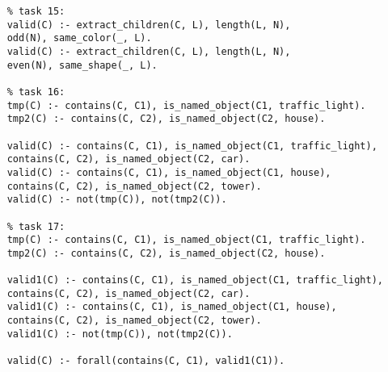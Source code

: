 \begin{verbatim}
	% task 15:
	valid(C) :- extract_children(C, L), length(L, N), 
	odd(N), same_color(_, L).
	valid(C) :- extract_children(C, L), length(L, N), 
	even(N), same_shape(_, L).
	
	% task 16:
	tmp(C) :- contains(C, C1), is_named_object(C1, traffic_light).
	tmp2(C) :- contains(C, C2), is_named_object(C2, house).
	
	valid(C) :- contains(C, C1), is_named_object(C1, traffic_light), 
	contains(C, C2), is_named_object(C2, car).
	valid(C) :- contains(C, C1), is_named_object(C1, house), 
	contains(C, C2), is_named_object(C2, tower).
	valid(C) :- not(tmp(C)), not(tmp2(C)).
	
	% task 17:
	tmp(C) :- contains(C, C1), is_named_object(C1, traffic_light).
	tmp2(C) :- contains(C, C2), is_named_object(C2, house).
	
	valid1(C) :- contains(C, C1), is_named_object(C1, traffic_light), 
	contains(C, C2), is_named_object(C2, car).
	valid1(C) :- contains(C, C1), is_named_object(C1, house), 
	contains(C, C2), is_named_object(C2, tower).
	valid1(C) :- not(tmp(C)), not(tmp2(C)).
	
	valid(C) :- forall(contains(C, C1), valid1(C1)).
\end{verbatim}
